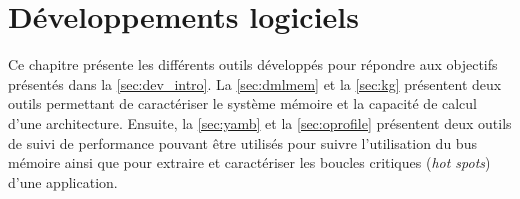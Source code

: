\chapter{Développements logiciels}\label{chap:dev}
\minitoc

Ce chapitre présente les différents outils développés pour répondre aux objectifs présentés dans la \autoref{sec:dev_intro}. La \autoref{sec:dmlmem} et la \autoref{sec:kg} présentent deux outils permettant de caractériser le système mémoire et la capacité de calcul d'une architecture. Ensuite, la \autoref{sec:yamb} et la \autoref{sec:oprofile} présentent deux outils de suivi de performance pouvant être utilisés pour suivre l'utilisation du bus mémoire ainsi que pour extraire et caractériser les boucles critiques (\textit{hot spots}) d'une application.



\newpage


\newpage


\newpage


\newpage



\newpage






\newpage

\printbibliography[heading=references,segment=\therefsegment]
   